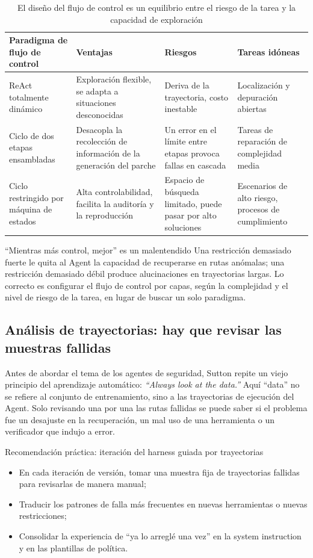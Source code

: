 \documentclass[a4paper]{article}
\begin{document}
\begin{table}[H]
\centering
\begin{tabular}{p{3.2cm}p{4.4cm}p{3.8cm}p{2.6cm}}
\toprule
\textbf{Paradigma de flujo de control} & \textbf{Ventajas} & \textbf{Riesgos} & \textbf{Tareas idóneas} \\
\midrule
ReAct totalmente dinámico & Exploración flexible, se adapta a situaciones desconocidas & Deriva de la trayectoria, costo inestable & Localización y depuración abiertas \\
Ciclo de dos etapas ensambladas & Desacopla la recolección de información de la generación del parche & Un error en el límite entre etapas provoca fallas en cascada & Tareas de reparación de complejidad media \\
Ciclo restringido por máquina de estados & Alta controlabilidad, facilita la auditoría y la reproducción & Espacio de búsqueda limitado, puede pasar por alto soluciones & Escenarios de alto riesgo, procesos de cumplimiento \\
\bottomrule
\end{tabular}
\caption{El diseño del flujo de control es un equilibrio entre el riesgo de la tarea y la capacidad de exploración}
\end{table}

\begin{warningbox}{``Mientras más control, mejor'' es un malentendido}
Una restricción demasiado fuerte le quita al Agent la capacidad de recuperarse en rutas anómalas; una restricción demasiado débil produce alucinaciones en trayectorias largas. Lo correcto es configurar el flujo de control por capas, según la complejidad y el nivel de riesgo de la tarea, en lugar de buscar un solo paradigma.
\end{warningbox}

\subsection{Análisis de trayectorias: hay que revisar las muestras fallidas}
Antes de abordar el tema de los agentes de seguridad, Sutton repite un viejo principio del aprendizaje automático: \textit{``Always look at the data.''} Aquí ``data'' no se refiere al conjunto de entrenamiento, sino a las trayectorias de ejecución del Agent. Solo revisando una por una las rutas fallidas se puede saber si el problema fue un desajuste en la recuperación, un mal uso de una herramienta o un verificador que indujo a error.

\begin{importantbox}{Recomendación práctica: iteración del harness guiada por trayectorias}
\begin{itemize}
    \item En cada iteración de versión, tomar una muestra fija de trayectorias fallidas para revisarlas de manera manual;
    \item Traducir los patrones de falla más frecuentes en nuevas herramientas o nuevas restricciones;
    \item Consolidar la experiencia de ``ya lo arreglé una vez'' en la system instruction y en las plantillas de política.
\end{itemize}
\end{importantbox}
\end{document}
